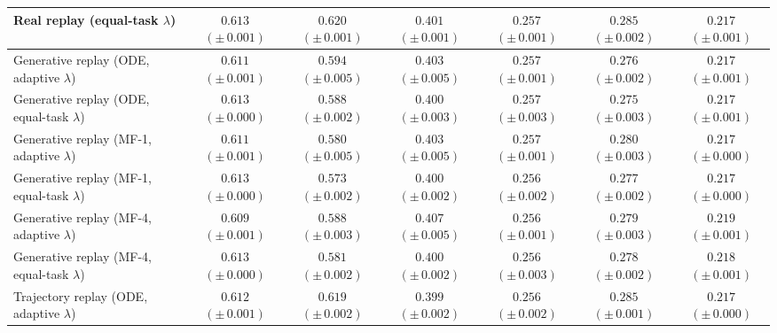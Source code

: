 \begin{table}[t]
{\begin{tabular}{@{}lcccccc@{}}
\rowcolor{referencerow} Real replay (equal-task $\lambda$) & $0.613$ {\scriptsize $(\pm\,0.001)$} & $0.620$ {\scriptsize $(\pm\,0.001)$} & $0.401$ {\scriptsize $(\pm\,0.001)$} & $0.257$ {\scriptsize $(\pm\,0.001)$} & $0.285$ {\scriptsize $(\pm\,0.002)$} & $0.217$ {\scriptsize $(\pm\,0.001)$} \\
\midrule
Generative replay (ODE, adaptive $\lambda$) & $0.611$ {\scriptsize $(\pm\,0.001)$} & $0.594$ {\scriptsize $(\pm\,0.005)$} & $0.403$ {\scriptsize $(\pm\,0.005)$} & $0.257$ {\scriptsize $(\pm\,0.001)$} & $0.276$ {\scriptsize $(\pm\,0.002)$} & $0.217$ {\scriptsize $(\pm\,0.001)$} \\
Generative replay (ODE, equal-task $\lambda$) & $0.613$ {\scriptsize $(\pm\,0.000)$} & $0.588$ {\scriptsize $(\pm\,0.002)$} & $0.400$ {\scriptsize $(\pm\,0.003)$} & $0.257$ {\scriptsize $(\pm\,0.003)$} & $0.275$ {\scriptsize $(\pm\,0.003)$} & $0.217$ {\scriptsize $(\pm\,0.001)$} \\
Generative replay (MF-1, adaptive $\lambda$) & $0.611$ {\scriptsize $(\pm\,0.001)$} & $0.580$ {\scriptsize $(\pm\,0.005)$} & $0.403$ {\scriptsize $(\pm\,0.005)$} & $0.257$ {\scriptsize $(\pm\,0.001)$} & $0.280$ {\scriptsize $(\pm\,0.003)$} & $0.217$ {\scriptsize $(\pm\,0.000)$} \\
Generative replay (MF-1, equal-task $\lambda$) & $0.613$ {\scriptsize $(\pm\,0.000)$} & $0.573$ {\scriptsize $(\pm\,0.002)$} & $0.400$ {\scriptsize $(\pm\,0.002)$} & $0.256$ {\scriptsize $(\pm\,0.002)$} & $0.277$ {\scriptsize $(\pm\,0.002)$} & $0.217$ {\scriptsize $(\pm\,0.000)$} \\
Generative replay (MF-4, adaptive $\lambda$) & $0.609$ {\scriptsize $(\pm\,0.001)$} & $0.588$ {\scriptsize $(\pm\,0.003)$} & $0.407$ {\scriptsize $(\pm\,0.005)$} & $0.256$ {\scriptsize $(\pm\,0.001)$} & $0.279$ {\scriptsize $(\pm\,0.003)$} & $0.219$ {\scriptsize $(\pm\,0.001)$} \\
Generative replay (MF-4, equal-task $\lambda$) & $0.613$ {\scriptsize $(\pm\,0.000)$} & $0.581$ {\scriptsize $(\pm\,0.002)$} & $0.400$ {\scriptsize $(\pm\,0.002)$} & $0.256$ {\scriptsize $(\pm\,0.003)$} & $0.278$ {\scriptsize $(\pm\,0.002)$} & $0.218$ {\scriptsize $(\pm\,0.001)$} \\
\midrule
\rowcolor{trajectoryrow} Trajectory replay (ODE, adaptive $\lambda$) & $0.612$ {\scriptsize $(\pm\,0.001)$} & $0.619$ {\scriptsize $(\pm\,0.002)$} & $0.399$ {\scriptsize $(\pm\,0.002)$} & $0.256$ {\scriptsize $(\pm\,0.002)$} & $0.285$ {\scriptsize $(\pm\,0.001)$} & $0.217$ {\scriptsize $(\pm\,0.000)$} \\

\end{tabular}}
\end{table}
